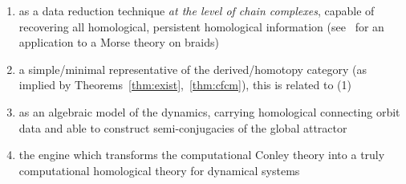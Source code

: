 \begin{enumerate}
\item as a data reduction technique {\em at the level of chain complexes}, capable of recovering all homological, persistent homological information (see~\cite{braids} for an application to a Morse theory on braids)
\item a simple/minimal representative of the derived/homotopy category (as implied by Theorems~\ref{thm:exist},~\ref{thm:cfcm}), this is related to (1)
\item as an algebraic model of the dynamics, carrying homological connecting orbit data and able to construct semi-conjugacies of the global attractor~\cite{scalar,dhmo,models}
\item the engine which transforms the computational Conley theory into a truly computational homological theory for dynamical systems

\end{enumerate}


